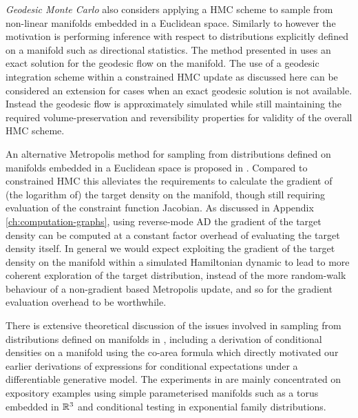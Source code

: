 \emph{Geodesic Monte Carlo} \citep{byrne2013geodesic} also considers applying a \ac{HMC} scheme to sample from non-linear manifolds embedded in a Euclidean space. Similarly to \citep{brubaker2012family} however the motivation is performing inference with respect to distributions explicitly defined on a manifold such as directional statistics. The method presented in \citep{byrne2013geodesic} uses an exact solution for the geodesic flow on the manifold. The use of a geodesic integration scheme within a constrained \ac{HMC} update as discussed here can be considered an extension for cases when an exact geodesic solution is not available. Instead the geodesic flow is approximately simulated while still maintaining the required volume-preservation and reversibility properties for validity of the overall \ac{HMC} scheme.

An alternative Metropolis method for sampling from distributions defined on manifolds embedded in a Euclidean space is proposed in \citep{zappa2017monte}. Compared to constrained \ac{HMC} this alleviates the requirements to calculate the gradient of (the logarithm of) the target density on the manifold, though still requiring evaluation of the constraint function Jacobian. As discussed in Appendix \ref{ch:computation-graphs}, using reverse-mode \ac{AD} the gradient of the target density can be computed at a constant factor overhead of evaluating the target density itself. In general we would expect exploiting the gradient of the target density on the manifold within a simulated Hamiltonian dynamic to lead to more coherent exploration of the target distribution, instead of the more random-walk behaviour of a non-gradient based Metropolis update, and so for the gradient evaluation overhead to be worthwhile.

There is extensive theoretical discussion of the issues involved in samp\-ling from distributions defined on manifolds in \citep{diaconis2013sampling}, including a derivation of conditional densities on a manifold using the co-area formula which directly motivated our earlier derivations of expressions for conditional expectations under a differentiable generative model. The experiments in \citep{diaconis2013sampling} are mainly concentrated on expository examples using simple parameterised manifolds such as a torus embedded in $\mathbb{R}^3$ and conditional testing in exponential family distributions. 



